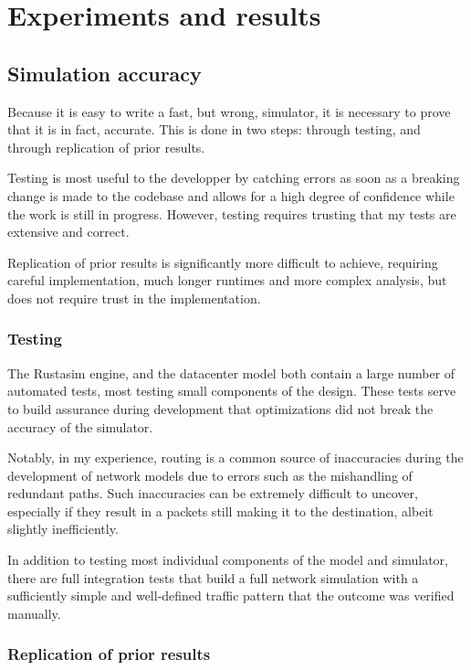 \chapter{Experiments and results} \label{results}

\section{Simulation accuracy} \label{accuracy}

Because it is easy to write a fast, but wrong, simulator, it is necessary to prove that it is in fact, accurate.
This is done in two steps: through testing, and through replication of prior results.

Testing is most useful to the developper by catching errors as soon as a breaking change is made to the codebase and allows for a high degree of confidence while the work is still in progress.
However, testing requires trusting that my tests are extensive and correct.

Replication of prior results is significantly more difficult to achieve, requiring careful implementation, much longer runtimes and more complex analysis, but does not require trust in the implementation.

\subsection{Testing} \label{testing}

The Rustasim engine, and the datacenter model both contain a large number of automated tests, most testing small components of the design.
These tests serve to build assurance during development that optimizations did not break the accuracy of the simulator.

Notably, in my experience, routing is a common source of inaccuracies during the development of network models due to errors such as the mishandling of redundant paths.
Such inaccuracies can be extremely difficult to uncover, especially if they result in a packets still making it to the destination, albeit slightly inefficiently.

In addition to testing most individual components of the model and simulator, there are full integration tests that build a full network simulation with a sufficiently simple and well-defined traffic pattern that the outcome was verified manually.

\subsection{Replication of prior results} \label{replication}


